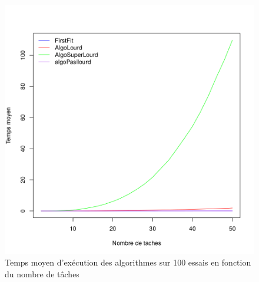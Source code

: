 \documentclass[11pt]{article}
\begin{document}
\begin{figure}[!ht]
    \center
    \includegraphics[scale = 0.4]{temps_moyen}
    \caption{Temps moyen d'exécution des algorithmes sur 100 essais en fonction du nombre de tâches}
\end{figure}
\end{document}

